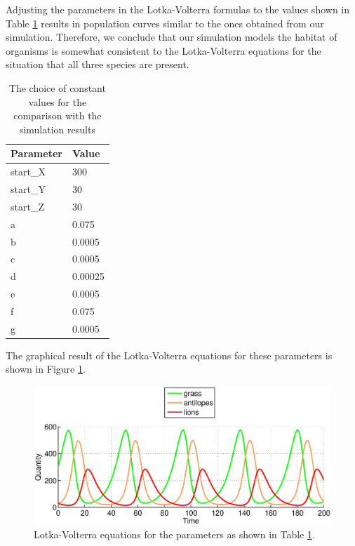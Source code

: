 \documentclass[11pt]{article}
\begin{document}
Adjusting the parameters in the Lotka-Volterra formulas to the values shown in Table \ref{tab:LotkaVolterraParametersFinal} results in  population curves similar to the ones obtained from our simulation. Therefore, we conclude that our simulation models the habitat of organisms is somewhat consistent to the Lotka-Volterra equations for the situation that all three species are present.

\begin{table}[htbp]
\centering
\begin{tabular}{l|l}
Parameter & Value \\ 
\hline 
\hline
start\_X & 300\\
\hline
start\_Y & 30\\
\hline
start\_Z & 30\\
\hline
a & 0.075\\ 
\hline 
b & 0.0005\\ 
\hline 
c & 0.0005\\  
\hline 
d & 0.00025\\
\hline 
e & 0.0005\\
\hline 
f & 0.075\\
\hline 
g & 0.0005\\
\end{tabular}
\caption{The choice of constant values for the comparison with the simulation results}
\label{tab:LotkaVolterraParametersFinal}
\end{table}

The graphical result of the Lotka-Volterra equations for these parameters is shown in Figure \ref{fig:LotkaVolterraThreeAdjusted}.

\begin{figure}
\centering
\includegraphics[scale=0.65]{LotkaVolterraThreeAdjusted.eps}
\caption{Lotka-Volterra equations for the parameters as shown in Table \ref{tab:LotkaVolterraParametersFinal}.}
\label{fig:LotkaVolterraThreeAdjusted}
\end{figure}
\end{document}
